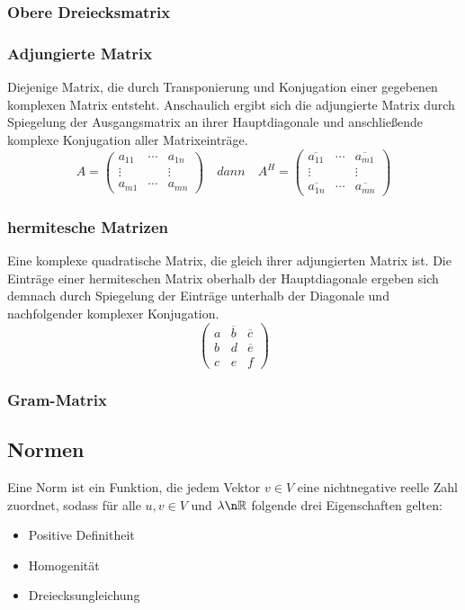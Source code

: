\documentclass[9pt]{article} %
\begin{document}
\subsubsection{Obere Dreiecksmatrix}

\subsubsection{Adjungierte Matrix}
Diejenige Matrix, die durch Transponierung und Konjugation einer gegebenen komplexen Matrix entsteht. Anschaulich ergibt sich die adjungierte Matrix durch Spiegelung der Ausgangsmatrix an ihrer Hauptdiagonale und anschließende komplexe Konjugation aller Matrixeinträge. \cite{AdjungierteMatrix}
\[
A = \begin{pmatrix}
a_{11} & \cdots & a_{1n} \\
\vdots & & \vdots \\
a_{m1} & \cdots & a_{mn}
\end{pmatrix} \quad dann \quad A^H = \begin{pmatrix}
\overline{a_{11}} & \cdots & \overline{a_{m1}} \\
\vdots & & \vdots \\
 \overline{a_{1n}}& \cdots & \overline{a_{mn}}
\end{pmatrix} 
\]

\subsubsection{hermitesche Matrizen}
Eine komplexe quadratische Matrix, die gleich ihrer adjungierten Matrix ist. Die Einträge einer hermiteschen Matrix oberhalb der Hauptdiagonale ergeben sich demnach durch Spiegelung der Einträge unterhalb der Diagonale und nachfolgender komplexer Konjugation.
\cite{HermitescheMatrix}
\[
\begin{pmatrix}
a & \overline{b} & \overline{c} \\
b &d& \overline{e} \\
c & e & f
\end{pmatrix}
\]

\subsubsection{Gram-Matrix}

\subsection{Normen}
Eine Norm ist ein Funktion, die jedem Vektor $v \in V$ eine  nichtnegative reelle Zahl zuordnet, sodass für alle $u, v \in V$ und  $\lambda \n \mathbb{R}$ folgende drei Eigenschaften gelten:
\begin{itemize}
    \item Positive Definitheit
    \item Homogenität
    \item Dreiecksungleichung
\end{itemize}
\end{document}
